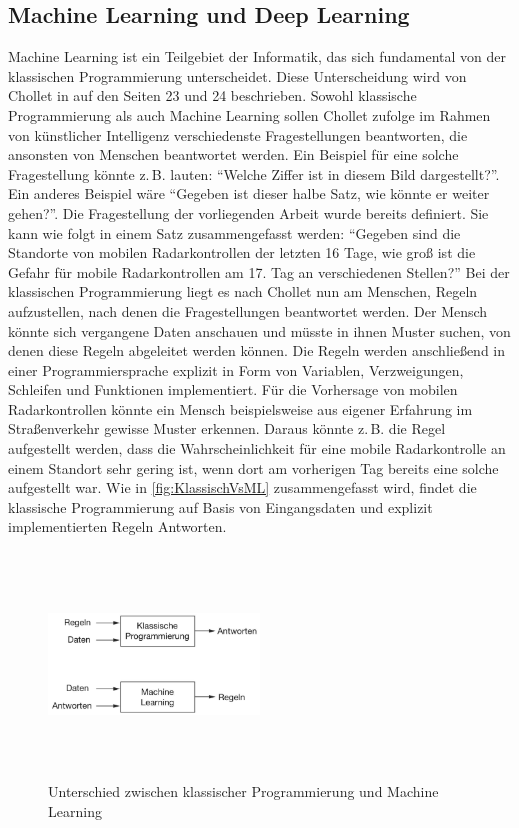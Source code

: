 \subsection{Machine Learning und Deep Learning}
\label{sec:MachineDeepLearning}

Machine Learning ist ein Teilgebiet der Informatik, das sich fundamental von der klassischen Programmierung unterscheidet.
Diese Unterscheidung wird von Chollet in \cite{DeepLearningPythonKeras} auf den Seiten 23 und 24 beschrieben.
Sowohl klassische Programmierung als auch Machine Learning sollen Chollet zufolge im Rahmen von künstlicher Intelligenz verschiedenste Fragestellungen beantworten, die ansonsten von Menschen beantwortet werden.
Ein Beispiel für eine solche Fragestellung könnte z.\,B. lauten: "`Welche Ziffer ist in diesem Bild dargestellt?"'.
Ein anderes Beispiel wäre "`Gegeben ist dieser halbe Satz, wie könnte er weiter gehen?"'.
Die Fragestellung der vorliegenden Arbeit wurde bereits definiert.
Sie kann wie folgt in einem Satz zusammengefasst werden:
"`Gegeben sind die Standorte von mobilen Radarkontrollen der letzten 16 Tage, wie groß ist die Gefahr für mobile Radarkontrollen am 17. Tag an verschiedenen Stellen?"'
Bei der klassischen Programmierung liegt es nach Chollet nun am Menschen, Regeln aufzustellen, nach denen die Fragestellungen beantwortet werden.
Der Mensch könnte sich vergangene Daten anschauen und müsste in ihnen Muster suchen, von denen diese Regeln abgeleitet werden können.
Die Regeln werden anschließend in einer Programmiersprache explizit in Form von Variablen, Verzweigungen, Schleifen und Funktionen implementiert.
Für die Vorhersage von mobilen Radarkontrollen könnte ein Mensch beispielsweise aus eigener Erfahrung im Straßenverkehr gewisse Muster erkennen.
Daraus könnte z.\,B. die Regel aufgestellt werden, dass die Wahrscheinlichkeit für eine mobile Radarkontrolle an einem Standort sehr gering ist, wenn dort am vorherigen Tag bereits eine solche aufgestellt war.
Wie in \autoref{fig:KlassischVsML} zusammengefasst wird, findet die klassische Programmierung auf Basis von Eingangsdaten und explizit implementierten Regeln Antworten.

\begin{figure}[h]
    \centering
    \includegraphics[width=0.5\textwidth,height=6cm,keepaspectratio=true]{content/images/KlassischVsML.png}
    \caption{Unterschied zwischen klassischer Programmierung und Machine Learning \cite[Abb.~1.2]{DeepLearningPythonKeras}}
    \label{fig:KlassischVsML}
\end{figure}

